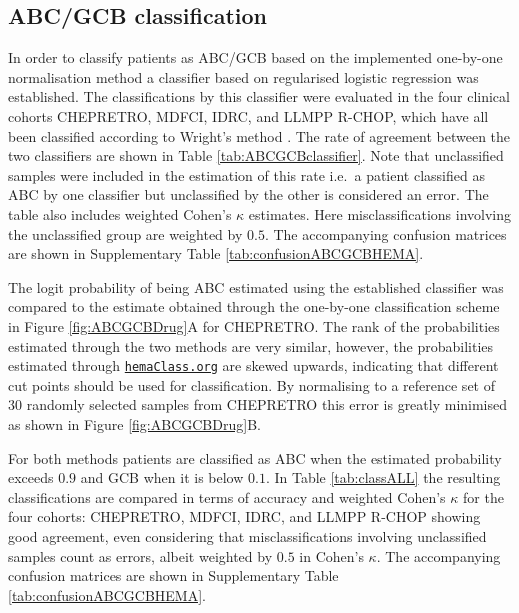 \documentclass{article}
\newcommand{\hemaClass}{\href{http://hemaClass.org}{\texttt{hemaClass.org}}}
\begin{document}
\subsection{ABC/GCB classification}
In order to classify patients as ABC/GCB based on the implemented one-by-one normalisation method a classifier based on regularised logistic regression was established.
The classifications by this classifier were evaluated in the four clinical cohorts CHEPRETRO, MDFCI, IDRC, and LLMPP R-CHOP, which have all been classified according to Wright's method \citep{Wright2003,Lenz2008a} .
The rate of agreement between the two classifiers are shown in Table \ref{tab:ABCGCBclassifier}.
Note that unclassified samples were included in the estimation of this rate i.e.\ a patient classified as ABC by one classifier but unclassified by the other is considered an error.
The table also includes weighted Cohen's $\kappa$ estimates.
Here misclassifications involving the unclassified group are weighted by $0.5$.
The accompanying confusion matrices are shown in Supplementary Table \ref{tab:confusionABCGCBHEMA}.

The logit probability of being ABC estimated using the established classifier was compared to the estimate obtained through the one-by-one classification scheme in Figure \ref{fig:ABCGCBDrug}A for CHEPRETRO.
The rank of the probabilities estimated through the two methods are very similar, however, the probabilities estimated through \hemaClass{} are skewed upwards, indicating that different cut points should be used for classification.
By normalising to a reference set of $30$ randomly selected samples from CHEPRETRO this error is greatly minimised as shown in Figure \ref{fig:ABCGCBDrug}B.

For both methods patients are classified as ABC when the estimated probability exceeds $0.9$ and GCB when it is below $0.1$.
In Table \ref{tab:classALL} the resulting classifications are compared in terms of accuracy and weighted Cohen's $\kappa$ for the four cohorts: CHEPRETRO, MDFCI, IDRC, and LLMPP R-CHOP showing good agreement, even considering that misclassifications involving unclassified samples count as errors, albeit weighted by $0.5$ in Cohen's $\kappa$.
The accompanying confusion matrices are shown in Supplementary Table \ref{tab:confusionABCGCBHEMA}.


\end{document}
